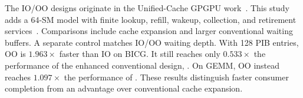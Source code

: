 The IO/OO designs originate in the Unified-Cache GPGPU work~\cite{zhao2024}.
This study adds a 64-SM model with finite lookup, refill, wakeup, collection, and retirement services~\cite{dtc-artifact}.
Comparisons include cache expansion and larger conventional waiting buffers.
A separate control matches IO/OO waiting depth.
With 128 PIB entries, OO is $1.963\times$ faster than IO on BICG.
It still reaches only $0.533\times$ the performance of the enhanced conventional design, \cplus{}.
On GEMM, OO instead reaches $1.097\times$ the performance of \cplus{}.
These results distinguish faster consumer completion from an advantage over conventional cache expansion.
